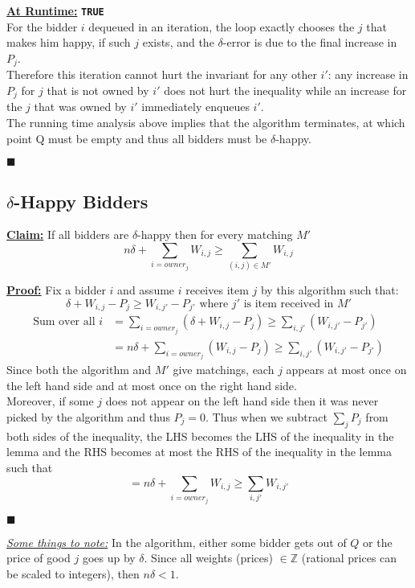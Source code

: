 \documentclass[twoside]{article}
\begin{document}
\underline{\textbf{At Runtime:}} \texttt{\textbf{TRUE}}\\
For the bidder $i$ dequeued in an iteration, the loop exactly chooses the $j$ that makes him happy, if such $j$ exists, and the $\delta$-error is due to the final increase in $P_j$.\\
Therefore this iteration cannot hurt the invariant for any other $i'$: any increase in $P_j$ for $j$ that is not owned by $i'$ does not hurt the inequality while an increase for the $j$ that was owned by $i'$ immediately enqueues $i'$.\\

The running time analysis above implies that the algorithm terminates, at which point Q must be empty and thus all bidders must be $\delta$-happy. \begin{flushright}$\blacksquare$\end{flushright}

\subsection{$\delta$-Happy Bidders}

\underline{\textbf{Claim:}} If all bidders are $\delta$-happy then for every matching $M'$
\[
n\delta + \sum_{i=owner_j} W_{i,j} \ge \sum_{(i,j) \in M'} W_{i,j}
\]

\underline{\textbf{Proof:}} Fix a bidder $i$ and assume $i$ receives item $j$ by this algorithm such that:
\[
\delta + W_{i,j} - P_j \geq W_{i,j'} - P_{j'} \text{ where $j'$ is item received in $M'$}
\]
\begin{align*}
\text{Sum over all }i &= \sum_{i=owner_j} (\delta + W_{i,j} - P_j) \geq \sum_{i,j'} (W_{i,j'} - P_{j'})\\
                      &= n\delta + \sum_{i=owner_j} (W_{i,j} - P_j) \geq \sum_{i,j'} (W_{i,j'} - P_{j'})
\end{align*}
Since both the algorithm and $M'$ give matchings, each $j$ appears at most once on the left hand side and at most once on the right hand side.\\
Moreover, if some $j$ does not appear on the left hand side then it was never picked by the algorithm and thus $P_j=0$. Thus when we subtract $\sum_j P_j$ from both sides of the inequality, the LHS becomes the LHS of the inequality in the lemma and the RHS becomes at most the RHS of the inequality in the lemma such that
\[
= n\delta + \sum_{i=owner_j} W_{i,j} \geq \sum_{i,j'} W_{i,j'}
\]
\begin{flushright}$\blacksquare$\end{flushright}
\textit{\underline{Some things to note:}} 
In the algorithm, either some bidder gets out of $Q$ or the price of good $j$ goes up by $\delta$.
Since all weights (prices) $\in \mathbb{Z}$ (rational prices can be scaled to integers), then
$n\delta < 1$.
\end{document}
